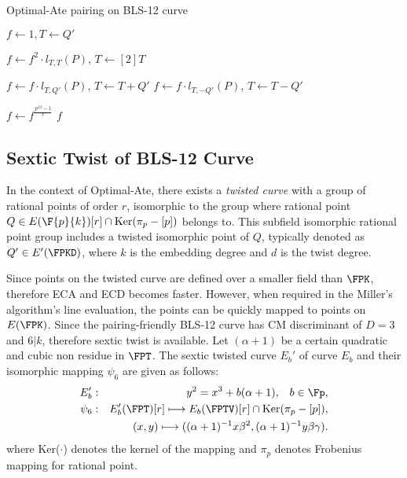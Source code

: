 \begin{algorithm}[H]
	\caption{Optimal-Ate pairing on BLS-12 curve}
	\label{optimal_algo}
	\DontPrintSemicolon

	\hspace{-3ex}
\hspace{-3ex}
	
	\nl $f \leftarrow 1,T \leftarrow Q'$\;
	\nl {} {
	\nl $f\leftarrow f^2\cdot l_{T,T}(P)$, $T\leftarrow [2]T$\;

	\nl {} {
	\nl $f\leftarrow f\cdot l_{T,Q'}(P)$, $T\leftarrow T+Q'$}
    \nl {} {
	\nl $f\leftarrow f\cdot l_{T,-Q'}(P)$, $T\leftarrow T-Q'$}}
	\nl $f\leftarrow f^{\frac{p^{12}-1}{r}}$\;
	 $f$\;
\end{algorithm}
\vspace{-0.6em}

\subsection{Sextic Twist of BLS-12 Curve} \label{sextic_twist}
In the context of Optimal-Ate, there exists a \textit{twisted curve} with a group of rational points of order $r$, isomorphic to the group where rational point $Q \in  E(\F{p}{k}) [r] \cap \text{Ker}(\pi_p - [p])$  belongs to. This subfield isomorphic rational point group includes a twisted isomorphic point of $Q$, typically denoted as $Q' \in E'(\FPKD)$, where $k$ is the embedding degree and $d$ is the twist degree.  

Since points on the twisted curve are defined over a smaller field than $\FPK$, therefore ECA and ECD becomes faster. 
However, when required in the Miller's algorithm's line evaluation, the points can be quickly mapped to points on $E(\FPK )$. 
Since the pairing-friendly BLS-12 \cite{SCN:BarLynSco02} curve has CM discriminant of $D = 3$ and $6|k$, therefore sextic twist is available.
Let $(\alpha+1)$ be a certain quadratic and cubic non residue in $\FPT$.  The sextic twisted curve $E_b'$ of  curve $E_b$ and their isomorphic mapping $\psi_6$ are given as follows:
\begin{eqnarray}
	E_b'&:&y^2=x^3+b(\alpha+1),\;\;\;b\in\Fp, \nonumber\\
	\psi_6&:&E_b'(\FPT)[r] \longmapsto E_b(\FPTV)[r]\cap {\rm Ker}(\pi_p-[p]),\nonumber\\
	&&(x,y)\longmapsto ((\alpha+1)^{-1}x \beta^2,(\alpha+1)^{-1}y\beta\gamma).\label{map_bn}
\end{eqnarray}
where Ker($\cdot$) denotes the kernel of the mapping and $\pi_p$ denotes Frobenius mapping  for rational point.

